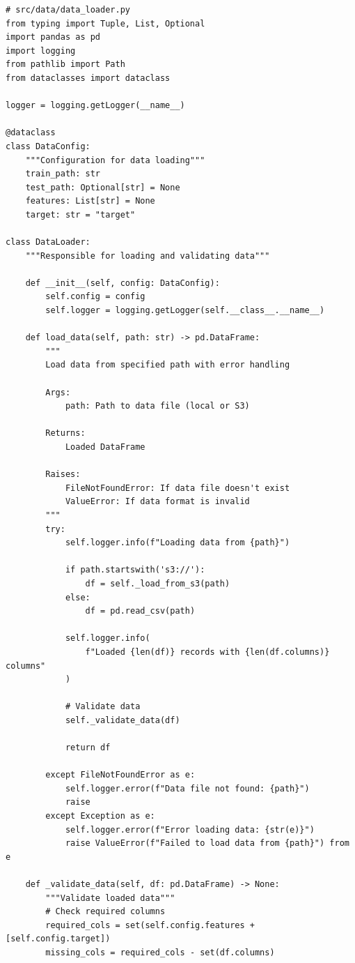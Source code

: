 \begin{lstlisting}[style=python, caption=Production ML Pipeline - Data Module]
# src/data/data_loader.py
from typing import Tuple, List, Optional
import pandas as pd
import logging
from pathlib import Path
from dataclasses import dataclass

logger = logging.getLogger(__name__)

@dataclass
class DataConfig:
    """Configuration for data loading"""
    train_path: str
    test_path: Optional[str] = None
    features: List[str] = None
    target: str = "target"

class DataLoader:
    """Responsible for loading and validating data"""

    def __init__(self, config: DataConfig):
        self.config = config
        self.logger = logging.getLogger(self.__class__.__name__)

    def load_data(self, path: str) -> pd.DataFrame:
        """
        Load data from specified path with error handling

        Args:
            path: Path to data file (local or S3)

        Returns:
            Loaded DataFrame

        Raises:
            FileNotFoundError: If data file doesn't exist
            ValueError: If data format is invalid
        """
        try:
            self.logger.info(f"Loading data from {path}")

            if path.startswith('s3://'):
                df = self._load_from_s3(path)
            else:
                df = pd.read_csv(path)

            self.logger.info(
                f"Loaded {len(df)} records with {len(df.columns)} columns"
            )

            # Validate data
            self._validate_data(df)

            return df

        except FileNotFoundError as e:
            self.logger.error(f"Data file not found: {path}")
            raise
        except Exception as e:
            self.logger.error(f"Error loading data: {str(e)}")
            raise ValueError(f"Failed to load data from {path}") from e

    def _validate_data(self, df: pd.DataFrame) -> None:
        """Validate loaded data"""
        # Check required columns
        required_cols = set(self.config.features + [self.config.target])
        missing_cols = required_cols - set(df.columns)


\end{lstlisting}
